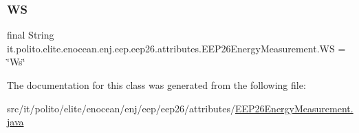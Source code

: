 \subsubsection{\texorpdfstring{WS}{WS}}
{\footnotesize\ttfamily final String it.\+polito.\+elite.\+enocean.\+enj.\+eep.\+eep26.\+attributes.\+E\+E\+P26\+Energy\+Measurement.\+WS = \char`\"{}Ws\char`\"{}\hspace{0.3cm}{\ttfamily [static]}}



The documentation for this class was generated from the following file\+:\begin{DoxyCompactItemize}
\item 
src/it/polito/elite/enocean/enj/eep/eep26/attributes/\hyperlink{_e_e_p26_energy_measurement_8java}{E\+E\+P26\+Energy\+Measurement.\+java}\end{DoxyCompactItemize}
